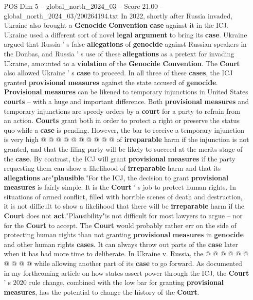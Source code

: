 \begin{textsample}{POS Dim 5 – global\_north\_2024\_03 – Score 21.00 – global\_north\_2024\_03/200264194.txt}
In 2022, shortly after Russia invaded, Ukraine also brought a \textbf{Genocide} \textbf{Convention} \textbf{case} against it in the ICJ.
Ukraine used a different sort of novel \textbf{legal} \textbf{argument} to bring its \textbf{case}.
Ukraine argued that Russia ' s false \textbf{allegations} of \textbf{genocide} against Russian-speakers in the Donbas, and Russia ' s use of these \textbf{allegations} as a pretext for invading Ukraine, amounted to a \textbf{violation} of the \textbf{Genocide} \textbf{Convention}.
The \textbf{Court} also allowed Ukraine ' s \textbf{case} to proceed.
In all three of these \textbf{cases}, the ICJ granted \textbf{provisional} \textbf{measures} against the state accused of \textbf{genocide}. \textbf{Provisional} \textbf{measures} can be likened to temporary injunctions in United States \textbf{courts} -- with a huge and important difference.
Both \textbf{provisional} \textbf{measures} and temporary injunctions are speedy orders by a \textbf{court} for a party to refrain from an action. \textbf{Courts} grant both in order to protect a right or preserve the status quo while a \textbf{case} is pending.
However, the bar to receive a temporary injunction is very high @ @ @ @ @ @ @ @ @ @ of \textbf{irreparable} harm if the injunction is not granted, and that the filing party will be likely to succeed at the merits stage of the \textbf{case}.
By contrast, the ICJ will grant \textbf{provisional} \textbf{measures} if the party requesting them can show a likelihood of \textbf{irreparable} harm and that its \textbf{allegations} are"\textbf{plausible}."For the ICJ, the decision to grant \textbf{provisional} \textbf{measures} is fairly simple.
It is the \textbf{Court} ' s job to protect human rights.
In situations of armed conflict, filled with horrible scenes of death and destruction, it is not difficult to show a likelihood that there will be \textbf{irreparable} harm if the \textbf{Court} does not \textbf{act}."Plausibility"is not difficult for most lawyers to argue -- nor for the \textbf{Court} to accept.
The \textbf{Court} would probably rather err on the side of protecting human rights than not granting \textbf{provisional} \textbf{measures} in \textbf{genocide} and other human rights \textbf{cases}.
It can always throw out parts of the \textbf{case} later when it has had more time to deliberate.
In Ukraine v.
Russia, the @ @ @ @ @ @ @ @ @ @ while allowing another part of its \textbf{case} to go forward.
As documented in my forthcoming article on how states assert power through the ICJ, the \textbf{Court} ' s 2020 rule change, combined with the low bar for granting \textbf{provisional} \textbf{measures}, has the potential to change the history of the \textbf{Court}.

\end{textsample}
